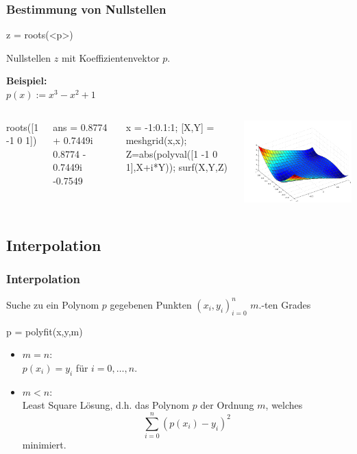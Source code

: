 \documentclass[hyperref={xetex}]{beamer}
\begin{document}
\begin{frame}[fragile]\frametitle{Bestimmung von Nullstellen}
\begin{matlabin}
z = roots(<p>)
\end{matlabin}
Nullstellen $z$ mit Koeffizientenvektor $p$.

\textbf{Beispiel:} \\
$p(x):= x^3 - x^2 +1$\\
\begin{columns}[c]
\begin{matlabin}
roots([1 -1 0 1])
\end{matlabin}
\begin{matlab}
ans =
   0.8774 + 0.7449i
   0.8774 - 0.7449i
  -0.7549  
\end{matlab}
\begin{matlabin}
x = -1:0.1:1;
[X,Y] = meshgrid(x,x);
Z=abs(polyval([1 -1 0 1],X+i*Y)); 
surf(X,Y,Z)
\end{matlabin}
\includegraphics[width=\textwidth]{figures/polynom2}
\end{columns}
\end{frame}


\subsection{Interpolation}
% 
%
\begin{frame}[fragile]\frametitle{Interpolation}
Suche zu  ein Polynom $p$ gegebenen Punkten $(x_i,y_i)_{i=0}^n$
$m$.-ten Grades
\begin{matlabin}
p = polyfit(x,y,m)
\end{matlabin}
\begin{itemize}
 \item $m=n$:\\ 
$p(x_i)=y_i$ f\"ur $i=0, \dots ,n$.
\item  $m<n$:\\ 
Least Square L\"osung, d.h. das Polynom $p$ der Ordnung $m$,
welches 
\[ 
\sum_{i=0}^n (p(x_i)-y_i)^2
\]
minimiert. 
\end{itemize}

\end{frame}
\end{document}
